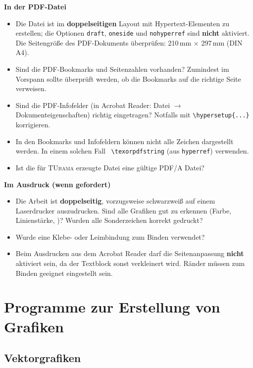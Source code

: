 \textbf{In der PDF-Datei}
\begin{itemize}
  \item Die Datei ist im \textbf{doppelseitigen} Layout mit Hypertext-Elementen zu erstellen; die Optionen \verb|draft|, \verb|oneside| und \verb|nohyperref| sind \textbf{nicht} aktiviert.
    Die Seitengröße des PDF-Dokuments überprüfen:
    210\,mm $\times$ 297\,mm (DIN A4).
  \item Sind die PDF-Bookmarks und Seitenzahlen vorhanden?
    Zumindest im Vorspann sollte überprüft werden, ob die Bookmarks auf die richtige Seite verweisen.
  \item Sind die PDF-Infofelder (in Acrobat Reader: Datei $\rightarrow$ Dokumenteigenschaften) richtig eingetragen?
    Notfalls mit \verb|\hypersetup{...}| korrigieren.
  \item In den Bookmarks und Infofeldern können nicht alle Zeichen dargestellt werden.
    In einem solchen Fall \zB\ \verb|\texorpdfstring| (aus \verb|hyperref|) verwenden.
  \item Ist die für \textsc{TUbama} erzeugte Datei eine gültige PDF/A Datei?
\end{itemize}

\textbf{Im Ausdruck (wenn gefordert)}
\begin{itemize}
  \item Die Arbeit ist \textbf{doppelseitig}, vorzugsweise schwarzweiß auf einem Laserdrucker auszudrucken.
    Sind alle Grafiken gut zu erkennen (Farbe, Linienstärke, \etc)?
    Wurden alle Sonderzeichen korrekt gedruckt?
  \item Wurde eine Klebe- oder Leimbindung zum Binden verwendet?
  \item Beim Ausdrucken aus dem Acrobat Reader darf die Seitenanpassung \textbf{nicht} aktiviert sein, da der Textblock sonst verkleinert wird.
    Ränder müssen zum Binden geeignet eingestellt sein.
\end{itemize}



\chapter{Programme zur Erstellung von Grafiken}
\label{cha:Anhang-Grafiken}

\section{Vektorgrafiken}


